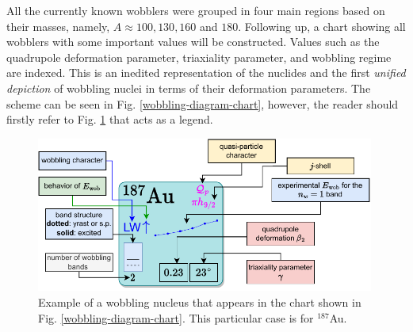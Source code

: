 All the currently known wobblers were grouped in four main regions based on their masses, namely, $A\approx 100, 130, 160$ and $180$. Following up, a chart showing all wobblers with some important values will be constructed. Values such as the quadrupole deformation parameter, triaxiality parameter, and wobbling regime are indexed. This is an inedited representation of the nuclides and the first \emph{unified depiction} of wobbling nuclei in terms of their deformation parameters. The scheme can be seen in Fig. \ref{wobbling-diagram-chart}, however, the reader should firstly refer to Fig. \ref{wobbling-diagrams-legend} that acts as a legend.
\begin{figure}
    \centering
    \includegraphics[width=0.99\textwidth]{Chapters/Figures/wobblers-chart-legend.pdf}
    \caption{Example of a wobbling nucleus that appears in the chart shown in Fig. \ref{wobbling-diagram-chart}. This particular case is for $^{187}$Au.}
    \label{wobbling-diagrams-legend}
\end{figure}
